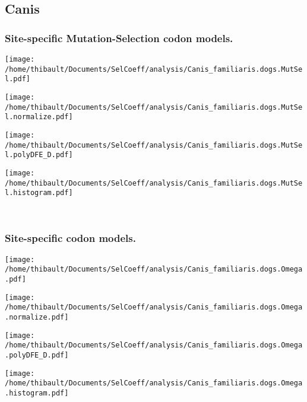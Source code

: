 \subsection{Canis} 
 
\subsubsection*{Site-specific Mutation-Selection codon models.} 
\begin{minipage}{0.49\linewidth} 
\texttt{[image: /home/thibault/Documents/SelCoeff/analysis/Canis\_familiaris.dogs.MutSel.pdf]} 
\end{minipage}
\begin{minipage}{0.49\linewidth} 
\texttt{[image: /home/thibault/Documents/SelCoeff/analysis/Canis\_familiaris.dogs.MutSel.normalize.pdf]} 
\end{minipage}
\begin{minipage}{0.49\linewidth} 
\texttt{[image: /home/thibault/Documents/SelCoeff/analysis/Canis\_familiaris.dogs.MutSel.polyDFE\_D.pdf]} 
\end{minipage}
\begin{minipage}{0.49\linewidth} 
\texttt{[image: /home/thibault/Documents/SelCoeff/analysis/Canis\_familiaris.dogs.MutSel.histogram.pdf]} 
\end{minipage}
\\ 
\subsubsection*{Site-specific codon models.} 
\begin{minipage}{0.49\linewidth} 
\texttt{[image: /home/thibault/Documents/SelCoeff/analysis/Canis\_familiaris.dogs.Omega.pdf]} 
\end{minipage}
\begin{minipage}{0.49\linewidth} 
\texttt{[image: /home/thibault/Documents/SelCoeff/analysis/Canis\_familiaris.dogs.Omega.normalize.pdf]} 
\end{minipage}
\begin{minipage}{0.49\linewidth} 
\texttt{[image: /home/thibault/Documents/SelCoeff/analysis/Canis\_familiaris.dogs.Omega.polyDFE\_D.pdf]} 
\end{minipage}
\begin{minipage}{0.49\linewidth} 
\texttt{[image: /home/thibault/Documents/SelCoeff/analysis/Canis\_familiaris.dogs.Omega.histogram.pdf]} 
\end{minipage}
\\ 
